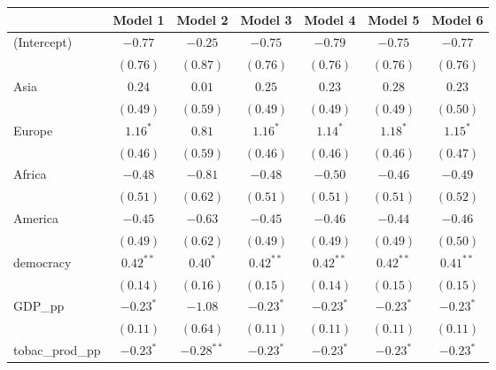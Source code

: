 
\begin{table}[!h]
\begin{center}
\begin{tabular}{l c c c c c c }
\toprule
 & Model 1 & Model 2 & Model 3 & Model 4 & Model 5 & Model 6 \\
\midrule
(Intercept)             & $-0.77$      & $-0.25$      & $-0.75$      & $-0.79$      & $-0.75$      & $-0.77$      \\
                        & $(0.76)$     & $(0.87)$     & $(0.76)$     & $(0.76)$     & $(0.76)$     & $(0.76)$     \\
Asia                    & $0.24$       & $0.01$       & $0.25$       & $0.23$       & $0.28$       & $0.23$       \\
                        & $(0.49)$     & $(0.59)$     & $(0.49)$     & $(0.49)$     & $(0.49)$     & $(0.50)$     \\
Europe                  & $1.16^{*}$   & $0.81$       & $1.16^{*}$   & $1.14^{*}$   & $1.18^{*}$   & $1.15^{*}$   \\
                        & $(0.46)$     & $(0.59)$     & $(0.46)$     & $(0.46)$     & $(0.46)$     & $(0.47)$     \\
Africa                  & $-0.48$      & $-0.81$      & $-0.48$      & $-0.50$      & $-0.46$      & $-0.49$      \\
                        & $(0.51)$     & $(0.62)$     & $(0.51)$     & $(0.51)$     & $(0.51)$     & $(0.52)$     \\
America                 & $-0.45$      & $-0.63$      & $-0.45$      & $-0.46$      & $-0.44$      & $-0.46$      \\
                        & $(0.49)$     & $(0.62)$     & $(0.49)$     & $(0.49)$     & $(0.49)$     & $(0.50)$     \\
democracy               & $0.42^{**}$  & $0.40^{*}$   & $0.42^{**}$  & $0.42^{**}$  & $0.42^{**}$  & $0.41^{**}$  \\
                        & $(0.14)$     & $(0.16)$     & $(0.15)$     & $(0.14)$     & $(0.15)$     & $(0.15)$     \\
GDP\_pp                 & $-0.23^{*}$  & $-1.08$      & $-0.23^{*}$  & $-0.23^{*}$  & $-0.23^{*}$  & $-0.23^{*}$  \\
                        & $(0.11)$     & $(0.64)$     & $(0.11)$     & $(0.11)$     & $(0.11)$     & $(0.11)$     \\
tobac\_prod\_pp         & $-0.23^{*}$  & $-0.28^{**}$ & $-0.23^{*}$  & $-0.23^{*}$  & $-0.23^{*}$  & $-0.23^{*}$  \\

\end{tabular}
\end{center}
\end{table}
